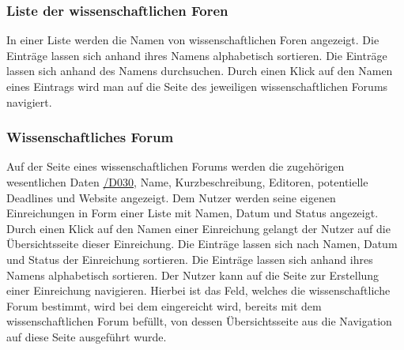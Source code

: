 \subsubsection{Liste der wissenschaftlichen Foren}
\begin{description}
     In einer Liste werden die Namen von wissenschaftlichen Foren angezeigt.
     Die Einträge lassen sich anhand ihres Namens alphabetisch sortieren.
     Die Einträge lassen sich anhand des Namens durchsuchen.
     Durch einen Klick auf den Namen eines Eintrags wird man auf die Seite des
    jeweiligen wissenschaftlichen Forums navigiert.
\end{description}

\subsubsection{Wissenschaftliches Forum}
\begin{description}
     Auf der Seite eines wissenschaftlichen Forums werden die zugehörigen wesentlichen Daten \hyperref[d030]{/D030},
    Name, Kurzbeschreibung, Editoren, potentielle Deadlines und Website angezeigt.
     Dem Nutzer werden seine eigenen Einreichungen in Form einer Liste mit Namen, Datum und Status
    angezeigt.
     Durch einen Klick auf den Namen einer Einreichung gelangt der Nutzer auf die Übersichtsseite
    dieser Einreichung.
     Die Einträge lassen sich nach Namen, Datum und Status
    der Einreichung sortieren.
     Die Einträge lassen sich anhand ihres Namens alphabetisch sortieren.
     Der Nutzer kann auf die Seite zur Erstellung einer Einreichung navigieren. Hierbei ist
    das Feld, welches die wissenschaftliche Forum bestimmt, wird bei dem eingereicht wird, bereits mit
    dem wissenschaftlichen Forum befüllt, von dessen Übersichtsseite aus die Navigation auf diese
    Seite ausgeführt wurde.
\end{description}

